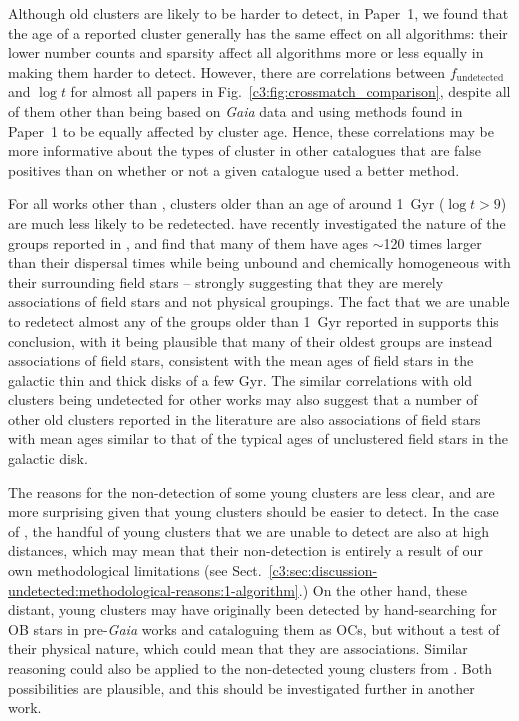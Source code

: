 Although old clusters are likely to be harder to detect, in Paper~1, we found that the age of a reported cluster generally has the same effect on all algorithms: their lower number counts and sparsity affect all algorithms more or less equally in making them harder to detect. However, there are correlations between $f_\text{undetected}$ and $\log t$ for almost all papers in Fig.~\ref{c3:fig:crossmatch_comparison}, despite all of them other than \cite{kharchenko_global_2013} being based on \emph{Gaia} data and using methods found in Paper~1 to be equally affected by cluster age. Hence, these correlations may be more informative about the types of cluster in other catalogues that are false positives than on whether or not a given catalogue used a better method.

For all works other than \cite{cantat-gaudin_clusters_2020}, clusters older than an age of around 1~Gyr ($\log t > 9$) are much less likely to be redetected. \cite{zucker_disconnecting_2022} have recently investigated the nature of the groups reported in \cite{kounkel_untangling_2020}, and find that many of them have ages $\sim$120 times larger than their dispersal times while being unbound and chemically homogeneous with their surrounding field stars -- strongly suggesting that they are merely associations of field stars and not physical groupings. The fact that we are unable to redetect almost any of the groups older than 1~Gyr reported in \cite{kounkel_untangling_2020} supports this conclusion, with it being plausible that many of their oldest groups are instead associations of field stars, consistent with the mean ages of field stars in the galactic thin and thick disks of a few Gyr. The similar correlations with old clusters being undetected for other works may also suggest that a number of other old clusters reported in the literature are also associations of field stars with mean ages similar to that of the typical ages of unclustered field stars in the galactic disk.

The reasons for the non-detection of some young clusters are less clear, and are more surprising given that young clusters should be easier to detect. In the case of \cite{cantat-gaudin_clusters_2020}, the handful of young clusters that we are unable to detect are also at high distances, which may mean that their non-detection is entirely a result of our own methodological limitations (see Sect.~\ref{c3:sec:discussion-undetected:methodological-reasons:1-algorithm}.) On the other hand, these distant, young clusters may have originally been detected by hand-searching for OB stars in pre-\emph{Gaia} works and cataloguing them as OCs, but without a test of their physical nature, which could mean that they are associations. Similar reasoning could also be applied to the non-detected young clusters from \cite{kharchenko_global_2013}. Both possibilities are plausible, and this should be investigated further in another work.

